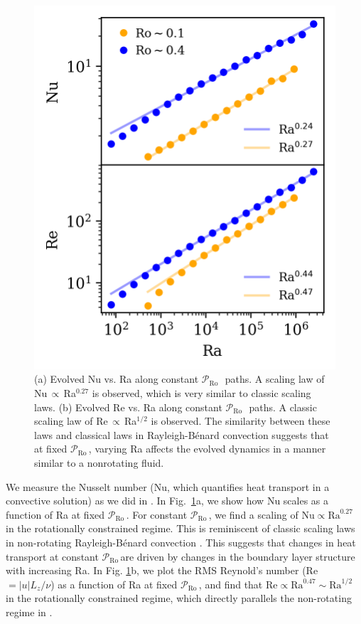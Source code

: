 \documentclass[twocolumn, amsmath, amsfonts, amssymb]{aastex62}
\newcommand{\RB}{Rayleigh-B\'{e}nard }
\newcommand{\pro}{\ensuremath{\mathcal{P}_{\text{Ro}}\,}}
\begin{document}
\begin{figure}[h]
\includegraphics{./figs/nu_and_re.png}
\caption{(a) Evolved Nu vs. Ra along constant
\pro$\,$ paths. A scaling law of Nu$\,\propto\,$Ra$^{0.27}$ is observed, which
is very similar to classic scaling laws.
(b) Evolved Re vs. Ra along constant \pro$\,$ paths.
A classic scaling law of Re$\,\propto\,$Ra$^{1/2}$ is observed. The
similarity between these laws and
classical laws in \RB convection suggests that at fixed \pro, varying Ra
affects the evolved dynamics in a manner similar to a nonrotating fluid.
\label{fig:nu_and_re} }
\end{figure}

We measure the Nusselt number (Nu, which quantifies heat transport in a convective
solution) as we did in \AB.
In Fig.~\ref{fig:nu_and_re}a, we show how Nu scales as a function
of Ra at fixed \pro. For constant \pro,
we find a scaling of $\text{Nu} \propto \text{Ra}^{0.27}$ in
the rotationally constrained regime. This is reminiscent of
classic scaling laws in non-rotating \RB convection \citep{ahlers&all2009}.
This suggests that changes in heat transport at constant \pro are driven by
changes in the boundary layer structure with increasing Ra.
In Fig. \ref{fig:nu_and_re}b, we plot the RMS Reynold's
number (Re $= |u| L_z / \nu$) as a function of Ra at fixed \pro, and find that 
$\text{Re} \propto \text{Ra}^{0.47} \sim \text{Ra}^{1/2}$ in the rotationally constrained regime,
which directly parallels the non-rotating regime in \AB.
\end{document}
